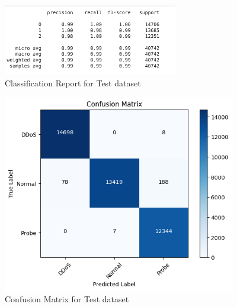 \begin{figure}[tbh] %
	\begin{center}
		\includegraphics[width=3in]{images/cReportTest.png} 
		\caption{Classification Report for Test dataset} %
		\label{Classification Report for Test dataset} 
	\end{center}
\end{figure}
\begin{figure}[tbh] %
	\begin{center}
		\includegraphics[width=4in]{images/confMatTest.png} 
		\caption{Confusion Matrix for Test dataset} %
		\label{Confusion Matrix for Test dataset} 
	\end{center}
\end{figure}
